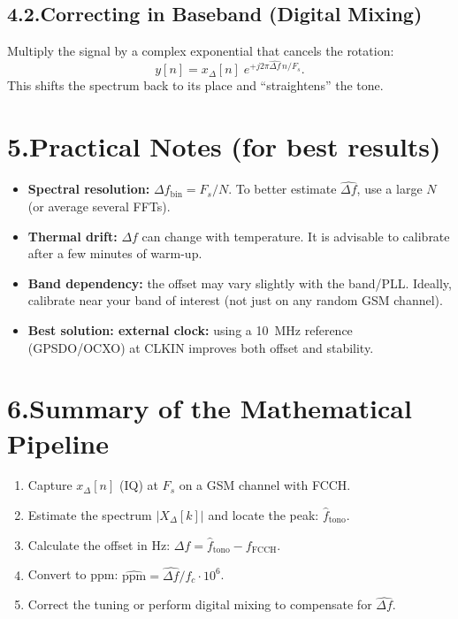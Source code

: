 \documentclass[10pt]{article}
\begin{document}
\subsection*{4.2.\;Correcting in Baseband (Digital Mixing)}
Multiply the signal by a complex exponential that cancels the rotation:
\begin{equation}
y[n] = x_\Delta[n]\; e^{+j2\pi \widehat{\Delta f}\, n/F_s}.
\end{equation}
This shifts the spectrum back to its place and ``straightens'' the tone.

\section*{5.\;Practical Notes (for best results)}
\begin{itemize}[leftmargin=1.2em]
\item \textbf{Spectral resolution:} $\Delta f_{\text{bin}}=F_s/N$. To better estimate $\widehat{\Delta f}$, use a large $N$ (or average several FFTs).
\item \textbf{Thermal drift:} $\Delta f$ can change with temperature. It is advisable to calibrate after a few minutes of warm-up.
\item \textbf{Band dependency:} the offset may vary slightly with the band/PLL. Ideally, calibrate near your band of interest (not just on any random GSM channel).
\item \textbf{Best solution: external clock:} using a \SI{10}{MHz} reference (GPSDO/OCXO) at CLKIN improves both offset and stability.
\end{itemize}

\vspace{-0.2em}
\section*{6.\;Summary of the Mathematical Pipeline}
\begin{enumerate}[leftmargin=1.2em]
\item Capture $x_\Delta[n]$ (IQ) at $F_s$ on a GSM channel with FCCH.
\item Estimate the spectrum $\lvert X_\Delta[k]\rvert$ and locate the peak: $\hat f_{\text{tono}}$.
\item Calculate the offset in Hz: $\widehat{\Delta f}=\hat f_{\text{tono}}-f_{\text{FCCH}}$.
\item Convert to ppm: $\widehat{\text{ppm}}=\widehat{\Delta f}/f_c\cdot 10^6$.
\item Correct the tuning or perform digital mixing to compensate for $\widehat{\Delta f}$.
\end{enumerate}
\end{document}
